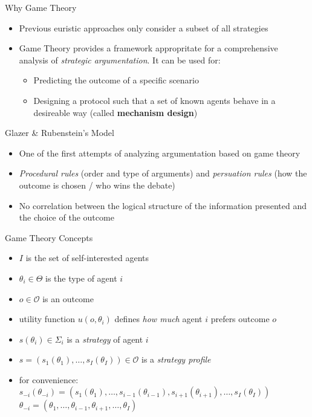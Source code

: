 \documentclass{beamer}
\begin{document}
\begin{frame}{Why Game Theory}
\begin{itemize}
    \pause
    \item Previous euristic approaches only consider a subset of all strategies \pause
    \item Game Theory provides a framework appropritate for a comprehensive analysis of \emph{strategic argumentation}. It can be used for:\pause
    \begin{itemize}
        \item Predicting the outcome of a specific scenario\pause
        \item Designing a protocol such that a set of known agents behave
            in a desireable way (called \textbf{mechanism design})
    \end{itemize}
\end{itemize}
\end{frame}

\begin{frame}{Glazer \& Rubenstein's Model}
\begin{itemize}
    \item One of the first attempts of analyzing argumentation based on game theory
    \item \emph{Procedural rules} (order and type of arguments) and \emph{persuation rules} (how the outcome is chosen / who wins the debate)
    \item No correlation between the logical structure of the information presented and the choice of the outcome
\end{itemize}
\end{frame}

\begin{frame}{Game Theory Concepts}
\begin{itemize}
    \pause
    \item $I$ is the set of self-interested agents\pause
    \item $\theta_i \in \Theta$ is the type of agent $i$\pause
    \item $o \in \mathcal{O}$ is an outcome\pause
    \item utility function $u(o, \theta_i)$ defines \emph{how much} agent $i$ prefers outcome $o$\pause
    \item $s(\theta_i) \in \Sigma_i$ is a \emph{strategy} of agent $i$\pause
    \item $s=(s_1(\theta_1),\dots,s_I(\theta_I)) \in \mathcal{O}$ is a \emph{strategy profile}\pause
    \item for convenience:
        $s_{-i}(\theta_{-i}) = (s_1(\theta_1),\dots,s_{i-1}(\theta_{i-1}), s_{i+1}(\theta_{i+1}),\dots,s_I(\theta_I))$
        $\theta_{-i}=(\theta_1,\dots,\theta_{i-1},\theta_{i+1},\dots,\theta_I)$
\end{itemize}
\end{frame}
\end{document}
